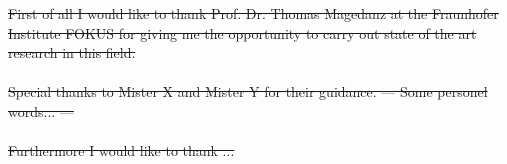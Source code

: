 \thispagestyle{empty}
\vspace*{3cm}


%
%
%
%
%
\noindent 

\sout{
First of all I would like to thank Prof. Dr. Thomas Magedanz at the Fraunhofer Institute FOKUS for giving me the opportunity to carry out state of the art research in this field. 
\\
\\
Special thanks to Mister X and Mister Y for their guidance. --- Some personel words... ---
\\
\\
Furthermore I would like to thank ...}